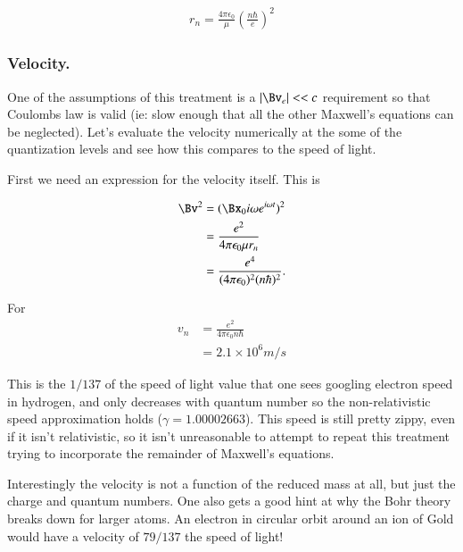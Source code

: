 \begin{align*}
r_n = \frac{4 \pi \epsilon_0}{\mu} \left(\frac{n \hbar}{e}\right)^2 
\end{align*}

\subsubsection{Velocity. }

One of the assumptions of this treatment is a $\Abs{\Bv_e} << c$ requirement so that Coulombs law is valid (ie: slow enough that all the other Maxwell's equations can be neglected).
Let's evaluate the velocity numerically at the some of the quantization levels and see how this compares to the speed of light.

First we need an expression for the velocity itself.  This is

\begin{align*}
\Bv^2 
&= ( \Bx_0 i \omega e^{i \omega t} )^2 \\
&= \frac{e^2}{4 \pi \epsilon_0 \mu r_n} \\
&= \frac{e^4}{(4 \pi \epsilon_0)^2 (n \hbar)^2}.
\end{align*}

For
\begin{align*}
v_n
&= \frac{e^2}{4 \pi \epsilon_0 n \hbar} \\
&= 2.1 \times 10^6 m/s
\end{align*}

This is the $1/137$ of the speed of light value that one sees googling electron speed in hydrogen, and only decreases with quantum number so the non-relativistic speed approximation holds 
($\gamma = 1.00002663$).  This speed is still pretty zippy, even if it isn't relativistic, so it isn't unreasonable to attempt to repeat this treatment trying to incorporate the remainder
of Maxwell's equations.

Interestingly the velocity is not a function of the reduced mass at all, but just the charge and quantum numbers.  One also gets a good hint at why the Bohr theory breaks down 
for larger atoms.  An electron in circular orbit around an ion of Gold would have a velocity of $79/137$ the speed of light!


